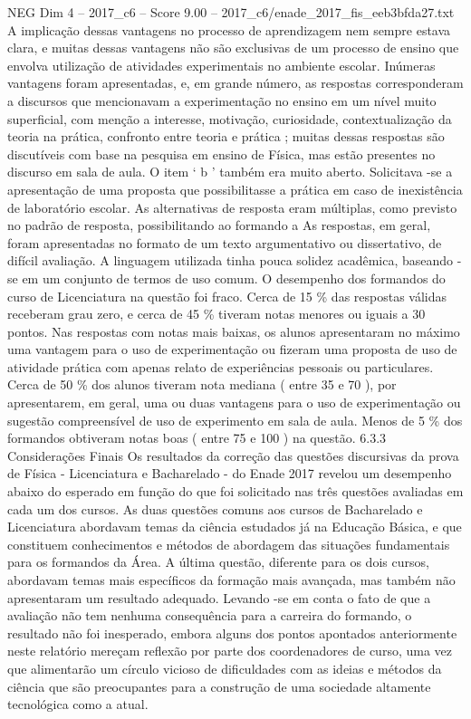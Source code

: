 \begin{textsample}{NEG Dim 4 – 2017\_c6 – Score 9.00 – 2017\_c6/enade\_2017\_fis\_eeb3bfda27.txt}
A implicação dessas vantagens no processo de aprendizagem nem sempre estava clara, e muitas dessas vantagens não são exclusivas de um processo de ensino que envolva utilização de atividades experimentais no ambiente escolar.
Inúmeras vantagens foram apresentadas, e, em grande número, as respostas corresponderam a discursos que mencionavam a experimentação no ensino em um nível muito superficial, com menção a interesse, motivação, curiosidade, contextualização da teoria na prática, confronto entre teoria e prática ; muitas dessas respostas são discutíveis com base na pesquisa em ensino de Física, mas estão presentes no discurso em sala de aula.
O item ‘ b ’ também era muito aberto.
Solicitava -se a apresentação de uma proposta que possibilitasse a prática em caso de inexistência de laboratório escolar.
As alternativas de resposta eram múltiplas, como previsto no padrão de resposta, possibilitando ao formando a As respostas, em geral, foram apresentadas no formato de um texto argumentativo ou dissertativo, de difícil avaliação.
A linguagem utilizada tinha pouca solidez acadêmica, baseando -se em um conjunto de termos de uso comum.
O desempenho dos formandos do curso de Licenciatura na questão foi fraco.
Cerca de 15 \% das respostas válidas receberam grau zero, e cerca de 45 \% tiveram notas menores ou iguais a 30 pontos.
Nas respostas com notas mais baixas, os alunos apresentaram no máximo uma vantagem para o uso de experimentação ou fizeram uma proposta de uso de atividade prática com apenas relato de experiências pessoais ou particulares.
Cerca de 50 \% dos alunos tiveram nota mediana ( entre 35 e 70 ), por apresentarem, em geral, uma ou duas vantagens para o uso de experimentação ou sugestão compreensível de uso de experimento em sala de aula.
Menos de 5 \% dos formandos obtiveram notas boas ( entre 75 e 100 ) na questão. 6.3.3 Considerações Finais Os resultados da correção das questões discursivas da prova de Física - Licenciatura e Bacharelado - do Enade 2017 revelou um desempenho abaixo do esperado em função do que foi solicitado nas três questões avaliadas em cada um dos cursos.
As duas questões comuns aos cursos de Bacharelado e Licenciatura abordavam temas da ciência estudados já na Educação Básica, e que constituem conhecimentos e métodos de abordagem das situações fundamentais para os formandos da Área.
A última questão, diferente para os dois cursos, abordavam temas mais específicos da formação mais avançada, mas também não apresentaram um resultado adequado.
Levando -se em conta o fato de que a avaliação não tem nenhuma consequência para a carreira do formando, o resultado não foi inesperado, embora alguns dos pontos apontados anteriormente neste relatório mereçam reflexão por parte dos coordenadores de curso, uma vez que alimentarão um círculo vicioso de dificuldades com as ideias e métodos da ciência que são preocupantes para a construção de uma sociedade altamente tecnológica como a atual.

\end{textsample}
